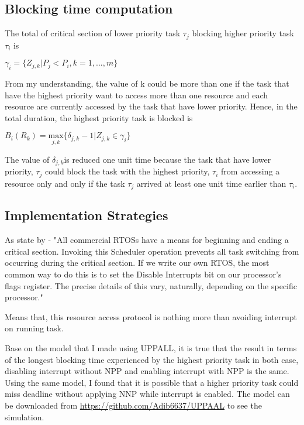\subsection{Blocking time computation}

	The total of critical section of lower priority task $\tau_{j}$ blocking higher priority task $\tau_{i}$ is

\begin{center}
$ \gamma_{i}=\{Z_{j,k} | P_{j}<P_{i}, k=1,...,m \} $ \cite{b5}
\end{center}

From my understanding, the value of k could be more than one if the task that have the highest priority want to access more than one resource and each resource are currently accessed by the task that have lower priority. Hence, in the total duration, the highest priority task is blocked is

\begin{center}

$B_{i}(R_{k})=\underset{j,k}{\mathrm{max}} \{ \delta_{j,k}-1 | Z_{j,k} \in \gamma_{i}\}  $ \cite{b5}
\end{center}

The value of $\delta_{j,k}$is reduced one unit time because the task that have lower priority, $\tau_{j}$ could block the task with the highest priority, $\tau_{i}$ from accessing a resource only and only if the task $\tau_{j}$  arrived at least one unit time earlier than $\tau_{i}$.

\subsection{Implementation Strategies}

As state by \cite{b6} - "All commercial RTOSs have a means for beginning and ending a critical section. Invoking this Scheduler operation prevents all task switching from occurring during the critical section. If we write our own RTOS, the most common way to do this is to set the Disable Interrupts bit on our processor's flags register. The precise details of this vary, naturally, depending on the specific processor."

Means that, this resource access protocol is nothing more than avoiding interrupt on running task. 

Base on the model that I made using UPPALL, it is true that the result in terms of the longest blocking time experienced by the highest priority task in both case, disabling interrupt without NPP and enabling interrupt with NPP is the same. Using the same model, I found that it is possible that a higher priority task could miss deadline without applying NNP while interrupt is enabled. The model can be downloaded from \url{https://github.com/Adib6637/UPPAAL} to see the simulation.

